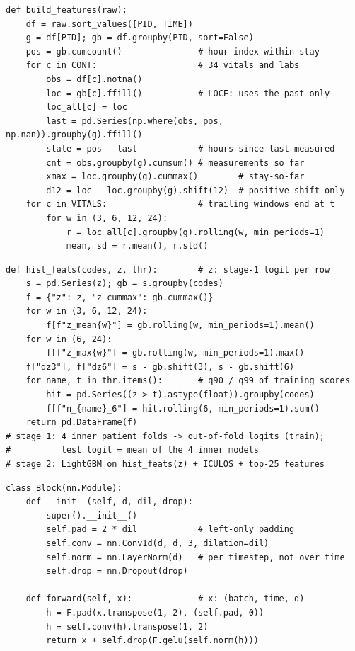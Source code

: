 
\begin{lstlisting}[caption={Causal feature builder (excerpt): forward fill, staleness, expanding and trailing statistics. Nothing looks ahead.},label={lst:feat}]
def build_features(raw):
    df = raw.sort_values([PID, TIME])
    g = df[PID]; gb = df.groupby(PID, sort=False)
    pos = gb.cumcount()               # hour index within stay
    for c in CONT:                    # 34 vitals and labs
        obs = df[c].notna()
        loc = gb[c].ffill()           # LOCF: uses the past only
        loc_all[c] = loc
        last = pd.Series(np.where(obs, pos, np.nan)).groupby(g).ffill()
        stale = pos - last            # hours since last measured
        cnt = obs.groupby(g).cumsum() # measurements so far
        xmax = loc.groupby(g).cummax()        # stay-so-far
        d12 = loc - loc.groupby(g).shift(12)  # positive shift only
    for c in VITALS:                  # trailing windows end at t
        for w in (3, 6, 12, 24):
            r = loc_all[c].groupby(g).rolling(w, min_periods=1)
            mean, sd = r.mean(), r.std()
\end{lstlisting}

\begin{lstlisting}[caption={Stage 2: causal history of the stage-1 score. Every term uses only rows up to $t$.},label={lst:stack}]
def hist_feats(codes, z, thr):        # z: stage-1 logit per row
    s = pd.Series(z); gb = s.groupby(codes)
    f = {"z": z, "z_cummax": gb.cummax()}
    for w in (3, 6, 12, 24):
        f[f"z_mean{w}"] = gb.rolling(w, min_periods=1).mean()
    for w in (6, 24):
        f[f"z_max{w}"] = gb.rolling(w, min_periods=1).max()
    f["dz3"], f["dz6"] = s - gb.shift(3), s - gb.shift(6)
    for name, t in thr.items():       # q90 / q99 of training scores
        hit = pd.Series((z > t).astype(float)).groupby(codes)
        f[f"n_{name}_6"] = hit.rolling(6, min_periods=1).sum()
    return pd.DataFrame(f)
# stage 1: 4 inner patient folds -> out-of-fold logits (train);
#          test logit = mean of the 4 inner models
# stage 2: LightGBM on hist_feats(z) + ICULOS + top-25 features
\end{lstlisting}

\begin{lstlisting}[caption={Causal temporal block (benchmark model): left-only padding and per-timestep normalization.},label={lst:tcn}]
class Block(nn.Module):
    def __init__(self, d, dil, drop):
        super().__init__()
        self.pad = 2 * dil            # left-only padding
        self.conv = nn.Conv1d(d, d, 3, dilation=dil)
        self.norm = nn.LayerNorm(d)   # per timestep, not over time
        self.drop = nn.Dropout(drop)

    def forward(self, x):             # x: (batch, time, d)
        h = F.pad(x.transpose(1, 2), (self.pad, 0))
        h = self.conv(h).transpose(1, 2)
        return x + self.drop(F.gelu(self.norm(h)))
\end{lstlisting}

